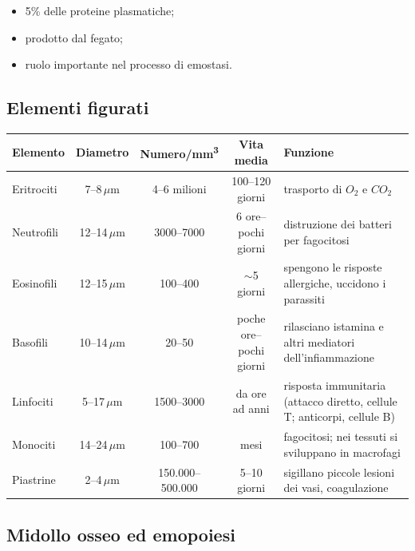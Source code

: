 \begin{itemize}
  \item 5\% delle proteine plasmatiche;
  \item prodotto dal fegato;
  \item ruolo importante nel processo di emostasi.
\end{itemize}

\subsection{Elementi figurati}

\begin{table}[htbp]
  \centering
  \small
  \renewcommand{\arraystretch}{1.3}
  \begin{tabularx}{\textwidth}{|l|c|c|c|X|}
    \hline
    \textbf{Elemento} & \textbf{Diametro} & \textbf{Numero/mm\textsuperscript{3}} & \textbf{Vita media} & \textbf{Funzione} \\
    \hline
    Eritrociti & 7--8\,$\mu$m & 4--6 milioni & 100--120 giorni & trasporto di $O_2$ e $CO_2$ \\
    \hline
    Neutrofili & 12--14\,$\mu$m & 3000--7000 & 6 ore--pochi giorni & distruzione dei batteri per fagocitosi \\
    \hline
    Eosinofili & 12--15\,$\mu$m & 100--400 & $\sim$5 giorni & spengono le risposte allergiche, uccidono i parassiti \\
    \hline
    Basofili & 10--14\,$\mu$m & 20--50 & poche ore--pochi giorni & rilasciano istamina e altri mediatori dell'infiammazione \\
    \hline
    Linfociti & 5--17\,$\mu$m & 1500--3000 & da ore ad anni & risposta immunitaria (attacco diretto, cellule T; anticorpi, cellule B) \\
    \hline
    Monociti & 14--24\,$\mu$m & 100--700 & mesi & fagocitosi; nei tessuti si sviluppano in macrofagi \\
    \hline
    Piastrine & 2--4\,$\mu$m & 150.000--500.000 & 5--10 giorni & sigillano piccole lesioni dei vasi, coagulazione \\
    \hline
  \end{tabularx}
\end{table}

\subsection{Midollo osseo ed emopoiesi}

